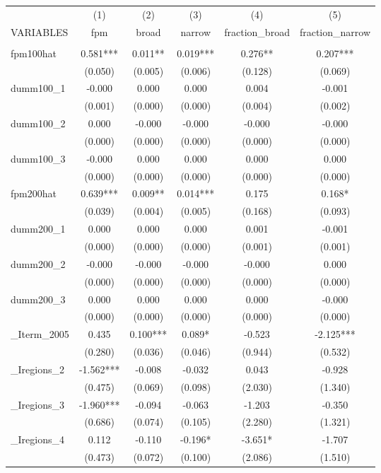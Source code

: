 \documentclass[]{article}
\begin{document}
\begin{tabular}{lccccc} \hline
 & (1) & (2) & (3) & (4) & (5) \\
VARIABLES & fpm & broad & narrow & fraction\_broad & fraction\_narrow \\ \hline
 &  &  &  &  &  \\
fpm100hat & 0.581*** & 0.011** & 0.019*** & 0.276** & 0.207*** \\
 & (0.050) & (0.005) & (0.006) & (0.128) & (0.069) \\
dumm100\_1 & -0.000 & 0.000 & 0.000 & 0.004 & -0.001 \\
 & (0.001) & (0.000) & (0.000) & (0.004) & (0.002) \\
dumm100\_2 & 0.000 & -0.000 & -0.000 & -0.000 & -0.000 \\
 & (0.000) & (0.000) & (0.000) & (0.000) & (0.000) \\
dumm100\_3 & -0.000 & 0.000 & 0.000 & 0.000 & 0.000 \\
 & (0.000) & (0.000) & (0.000) & (0.000) & (0.000) \\
fpm200hat & 0.639*** & 0.009** & 0.014*** & 0.175 & 0.168* \\
 & (0.039) & (0.004) & (0.005) & (0.168) & (0.093) \\
dumm200\_1 & 0.000 & 0.000 & 0.000 & 0.001 & -0.001 \\
 & (0.000) & (0.000) & (0.000) & (0.001) & (0.001) \\
dumm200\_2 & -0.000 & -0.000 & -0.000 & -0.000 & 0.000 \\
 & (0.000) & (0.000) & (0.000) & (0.000) & (0.000) \\
dumm200\_3 & 0.000 & 0.000 & 0.000 & 0.000 & -0.000 \\
 & (0.000) & (0.000) & (0.000) & (0.000) & (0.000) \\
\_Iterm\_2005 & 0.435 & 0.100*** & 0.089* & -0.523 & -2.125*** \\
 & (0.280) & (0.036) & (0.046) & (0.944) & (0.532) \\
\_Iregions\_2 & -1.562*** & -0.008 & -0.032 & 0.043 & -0.928 \\
 & (0.475) & (0.069) & (0.098) & (2.030) & (1.340) \\
\_Iregions\_3 & -1.960*** & -0.094 & -0.063 & -1.203 & -0.350 \\
 & (0.686) & (0.074) & (0.105) & (2.280) & (1.321) \\
\_Iregions\_4 & 0.112 & -0.110 & -0.196* & -3.651* & -1.707 \\
 & (0.473) & (0.072) & (0.100) & (2.086) & (1.510) \\

\end{tabular}
\end{document}
